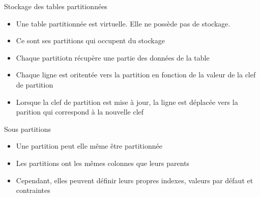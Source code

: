 \begin{frame}[fragile]{Stockage des tables partitionnées}

   \begin{itemize}
      \item Une table partitionnée est virtuelle. Elle ne possède pas de stockage.
      \item Ce sont ses partitions qui occupent du stockage
      \item Chaque partitiotn récupère une partie des données de la table
      \item Chaque ligne est oritentée vers la partition en fonction de la valeur de la clef de partition
      \item Lorsque la clef de partition est mise à jour, la ligne est déplacée vers la parition qui correspond à la nouvelle clef
   \end{itemize}

\end{frame}


\begin{frame}[fragile]{Sous partitions}

   \begin{itemize}
      \item Une partition peut elle même être partitionnée
      \item Les partitions ont les mêmes colonnes que leurs parents
      \item Cependant, elles peuvent définir leurs propres indexes, valeurs par défaut et contraintes
   \end{itemize}

\begin{toile}
\end{toile}

\end{frame}


